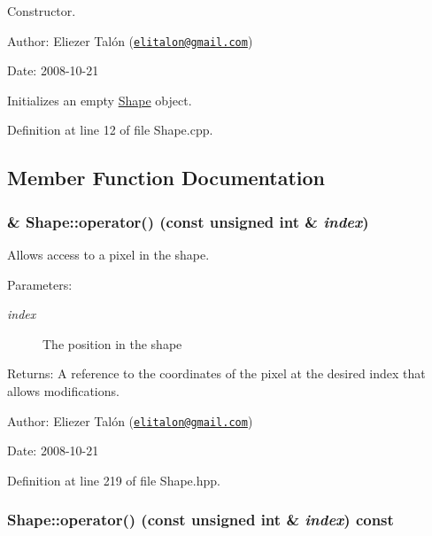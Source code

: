 Constructor. 

\begin{Desc}
\item[Author:]Eliezer Talón (\href{mailto:elitalon@gmail.com}{\tt elitalon@gmail.com}) \end{Desc}
\begin{Desc}
\item[Date:]2008-10-21\end{Desc}
Initializes an empty \hyperlink{class_shape}{Shape} object. 

Definition at line 12 of file Shape.cpp.

\subsection{Member Function Documentation}
\hypertarget{class_shape_7d12f3a76e2bfb7963c00237eba41e0a}{
\subsubsection[operator()]{ \& Shape::operator() (const unsigned int \& {\em index})}}
\label{class_shape_7d12f3a76e2bfb7963c00237eba41e0a}


Allows access to a pixel in the shape. 

\begin{Desc}
\item[Parameters:]
\begin{description}
\item[{\em index}]The position in the shape\end{description}
\end{Desc}
\begin{Desc}
\item[Returns:]A reference to the coordinates of the pixel at the desired index that allows modifications.\end{Desc}
\begin{Desc}
\item[Author:]Eliezer Talón (\href{mailto:elitalon@gmail.com}{\tt elitalon@gmail.com}) \end{Desc}
\begin{Desc}
\item[Date:]2008-10-21 \end{Desc}


Definition at line 219 of file Shape.hpp.\hypertarget{class_shape_79caae3047826779e0c8094e9882843b}{
\subsubsection[operator()]{ Shape::operator() (const unsigned int \& {\em index}) const}}
\label{class_shape_79caae3047826779e0c8094e9882843b}



